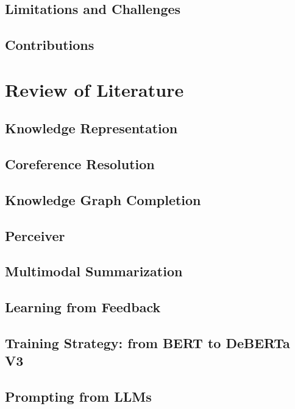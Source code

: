 \documentclass[doublespace,nopageskip]{VTthesis}
\begin{document}
    \section{Limitations and Challenges} \label{se:limit}
        
    \section{Contributions} \label{se:contribute}
        

    \chapter{Review of Literature} \label{ch:lit_review}
        \section{Knowledge Representation} \label{se:AMR}
            
        \section{Coreference Resolution} \label{se:coref}
            
        \section{Knowledge Graph Completion} \label{se:KGC}
            
        \section{Perceiver} \label{se:perceiver}
                    
        \section{Multimodal Summarization} \label{se:multi-sum}
            
        \section{Learning from Feedback} \label{se:lear-feed}
            
        \section{Training Strategy: from BERT to DeBERTa V3} \label{se:training-strategic}
            
        \section{Prompting from LLMs} \label{se:prompt}
            
            
\end{document}

